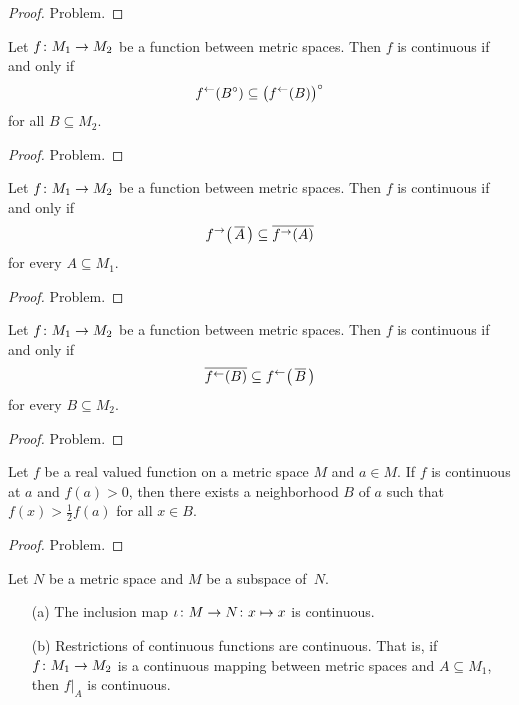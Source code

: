 \begin{proof} Problem.  \ns  \end{proof}

\begin{prop} Let $f\colon M_1 \rightarrow M_2$ be a function between metric spaces.  Then $f$ is
continuous if and only if
  \[ f^\gets(B^{\circ}) \subseteq \bigl(f^\gets(B)\bigr)^{\circ} \]
for all $B \subseteq M_2$.
\end{prop}

\begin{proof} Problem.  \ns  \end{proof}

\begin{prop} Let $f \colon M_1 \rightarrow M_2$ be a function between metric spaces.  Then $f$ is
continuous if and only if
  \[ f^{\rightarrow}\bigl(\,\overline{A}\,\bigr) \subseteq \overline{f^{\rightarrow}(A)} \]
for every $A \subseteq M_1$.
\end{prop}

\begin{proof} Problem.  \ns  \end{proof}

\begin{prop} Let $f\colon M_1 \rightarrow M_2$ be a function between metric spaces.  Then $f$ is
continuous if and only if
  \[ \overline{f^\gets(B)}  \subseteq f^\gets\bigl(\,\overline{B}\,\bigr) \]
for every $B \subseteq M_2$.
\end{prop}

\begin{proof} Problem.  \ns  \end{proof}

\begin{prop} Let $f$ be a real valued function on a metric space $M$ and $a \in M$.  If $f$ is
continuous at $a$ and $f(a) > 0$, then there exists a neighborhood $B$ of $a$ such that $f(x) >
\frac12 f(a)$ for all $x \in B$.
\end{prop}

\begin{proof} Problem.   \ns  \end{proof}

\begin{prop} Let $N$ be a metric space and $M$ be a subspace of~$N$.
 \begin{enumerate}
  \item[(a)] The inclusion map $\iota\colon M \rightarrow N\colon x \mapsto x$ is continuous.
  \item[(b)] Restrictions of continuous functions are continuous. That is, if $f\colon M_1 \rightarrow M_2$
is a continuous mapping between metric spaces and $A \subseteq M_1$, then $f|_A$ is continuous.
 \end{enumerate}
\end{prop}

